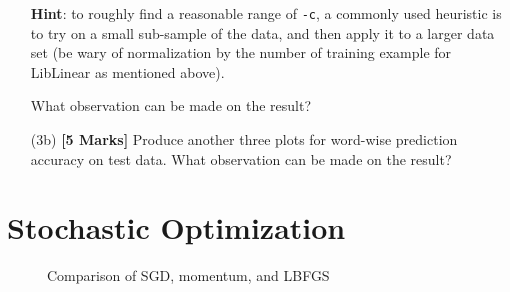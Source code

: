 \documentclass[11pt]{report}
\begin{document}
\begin{itemize}
		\textbf{Hint}: to roughly find a reasonable range of \verb#-c#, a commonly used heuristic is to try on a small sub-sample of the data, and then apply it to a larger data set (be wary of normalization by the number of training example for LibLinear as mentioned above).
		
		What observation can be made on the result?
		
		\item[(3b)] {\bf [5 Marks]} Produce another three plots for word-wise prediction accuracy on test data.  What observation can be made on the result?
	\end{itemize}
	
	
	\section{Stochastic Optimization}
	
	\begin{figure}[t]
		\centering
		\hspace{4em}
		\caption{Comparison of SGD, momentum, and LBFGS}
		\label{fig:compare_optimizer}
	\end{figure}
	
\end{document}
